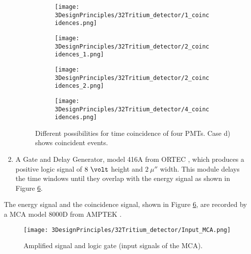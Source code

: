 \begin{enumerate}
\begin{figure}
\centering
    \begin{subfigure}[b]{0.45\textwidth}
    \centering
    \texttt{[image: 3DesignPrinciples/32Tritium\_detector/1\_coincidences.png]}  
    \caption{\label{subfig:signalInOnePMT}}
    \end{subfigure}
    \hfill
    \begin{subfigure}[b]{0.45\textwidth}
    \centering
    \texttt{[image: 3DesignPrinciples/32Tritium\_detector/2\_coincidences\_1.png]}  
    \caption{\label{subfig:signalInTwoPMTOneDetector}}
    \end{subfigure}
    \hfill
    \begin{subfigure}[b]{0.45\textwidth}
    \centering
    \texttt{[image: 3DesignPrinciples/32Tritium\_detector/2\_coincidences\_2.png]}  
    \caption{\label{subfig:signalInTwoPMTOtherDetector}}
    \end{subfigure}
    \hfill
    \begin{subfigure}[b]{0.45\textwidth}
    \centering
    \texttt{[image: 3DesignPrinciples/32Tritium\_detector/4\_coincidences.png]}  
    \caption{\label{subfig:signalInAllPMTsBothDetector}}
    \end{subfigure}
 \caption{Different possibilities for time coincidence of four PMTs. Case d) shows coincident events.}
 \label{fig:DifferentCoincidences}
\end{figure}

\item{} A Gate and Delay Generator, model 416A from ORTEC \cite{DataSheetGateAndDelay}, which produces a positive logic signal of $8~\volt$ height and $2~\mu\second$ width. This module delays the time windows until they overlap with the energy signal as shown in Figure \ref{fig:InputSignalsMCA}.

\end{enumerate}

The energy signal and the coincidence signal, shown in Figure \ref{fig:InputSignalsMCA}, are recorded by a MCA model 8000D from AMPTEK \cite{DataSheetMCA}.

\begin{figure}[htbp]
\centering
\texttt{[image: 3DesignPrinciples/32Tritium\_detector/Input\_MCA.png]}
\caption{Amplified signal and logic gate (input signals of the MCA).\label{fig:InputSignalsMCA}}
\end{figure}